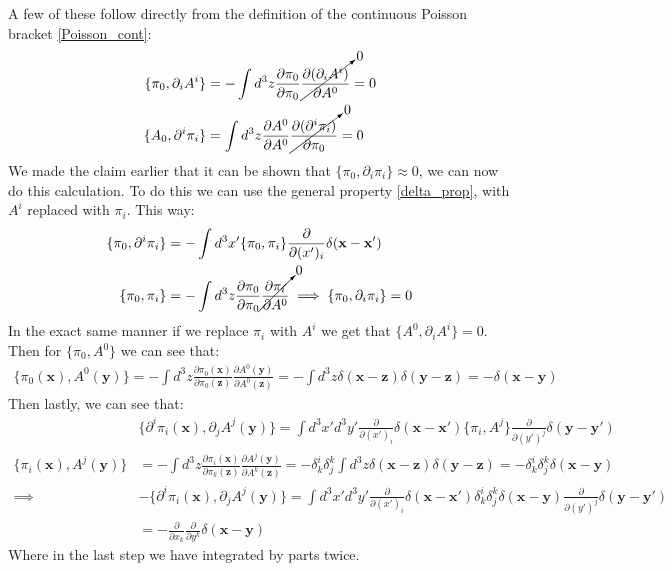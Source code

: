\documentclass[11pt]{article}
\numberwithin{equation}{section}
\begin{document}
\begin{itemize}
  A few of these follow directly from the definition of the continuous Poisson bracket \ref{Poisson_cont}:
  \begin{align*}
     \{\pi_0,\partial_iA^i\} &= -\int d^3z \frac{\partial \pi_0}{\partial\pi_0}\cancelto{0}{\frac{\partial(\partial_iA^i)}{\partial A^0}} = 0 \\
      \{A_0,\partial^i\pi_i\} &= \int d^3z \frac{\partial A^0}{\partial A^0}\cancelto{0}{\frac{\partial(\partial^i\pi_i)}{\partial \pi_0}} = 0
   \end{align*} 
   We made the claim earlier that it can be shown that $\{\pi_0,\partial_i\pi_i \} \approx 0$, we can now do this calculation. To do this we can use the general property \ref{delta_prop}, with $A^i$ replaced with $\pi_i$. This way:
  \begin{align*}
    \{\pi_0,\partial^i\pi_i \} & = -\int d^3x'\{\pi_0,\pi_i\}\frac{\partial}{\partial(x')_i}\delta(\textbf{x}-\textbf{x}') \\
     \{\pi_0,\pi_i\}& = -\int d^3z\frac{\partial \pi_0}{\partial\pi_0}\cancelto{0}{\frac{\partial\pi_i}{\partial A^0}}\implies  \{\pi_0,\partial_i\pi_i \} = 0
  \end{align*}
  In the exact same manner if we replace $\pi_i$ with $A^i$ we get that $ \{A^0,\partial_iA^i \} = 0$. Then for $\{\pi_0,A^0\}$ we can see that:
  \begin{align*}
    \{\pi_0(\textbf{x}),A^0(\textbf{y})\} = -\int d^3z \frac{\partial \pi_0(\textbf{x})}{\partial \pi_0(\textbf{z})}\frac{\partial A^0(\textbf{y})}{\partial A^0(\textbf{z})} = -\int d^3z \delta(\textbf{x}-\textbf{z})\delta(\textbf{y}-\textbf{z})  = -\delta(\textbf{x}-\textbf{y})
  \end{align*}
  Then lastly, we can see that:
  \begin{align*}
    &\{\partial^i\pi_i(\textbf{x}),\partial_jA^j(\textbf{y})\} = \int d^3x'd^3y'\frac{\partial}{\partial(x')_i}\delta(\textbf{x}-\textbf{x}')\{\pi_i,A^j\}\frac{\partial}{\partial(y')^j}\delta(\textbf{y}-\textbf{y}') \\
    \{\pi_i(\textbf{x}),A^j(\textbf{y})\}& = -\int d^3z\frac{\partial \pi_i(\textbf{x})}{\partial \pi_k(\textbf{z})}\frac{\partial A^j(\textbf{y})}{\partial A^k(\textbf{z})} = -\delta^i_k\delta^k_j\int d^3z\delta(\textbf{x}-\textbf{z})\delta(\textbf{y}-\textbf{z}) = -\delta^i_k\delta^k_j\delta(\textbf{x}-\textbf{y}) \\
    \implies &  -\{\partial^i\pi_i(\textbf{x}),\partial_jA^j(\textbf{y})\} = \int d^3x'd^3y'\frac{\partial}{\partial(x')_i}\delta(\textbf{x}-\textbf{x}')\delta^i_k\delta^k_j\delta(\textbf{x}-\textbf{y})\frac{\partial}{\partial(y')^j}\delta(\textbf{y}-\textbf{y}') \\
    & = -\frac{\partial}{\partial x_k}\frac{\partial}{\partial y^k}\delta(\textbf{x}-\textbf{y})
  \end{align*}
  Where in the last step we have integrated by parts twice. 


\end{itemize}
\end{document}
